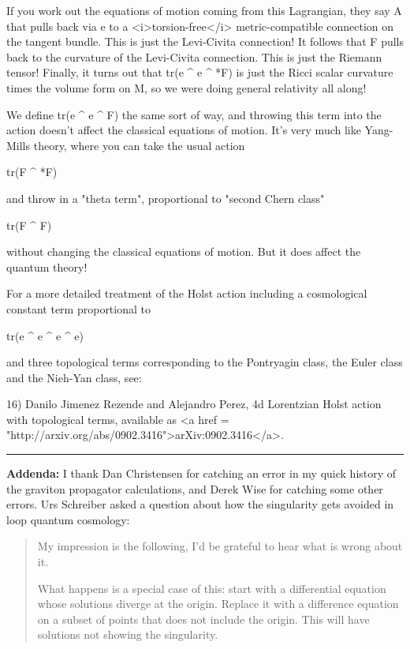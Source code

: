 If you work out the equations of motion coming from this Lagrangian,
they say A that pulls back via e to a <i>torsion-free</i>
metric-compatible connection on the tangent bundle.  This is just the
Levi-Civita connection!  It follows that F pulls back to the curvature
of the Levi-Civita connection.  This is just the Riemann tensor!
Finally, it turns out that tr(e ^ e ^ *F) is just the Ricci scalar
curvature times the volume form on M, so we were doing general
relativity all along!

We define tr(e ^ e ^ F) the same sort of way, and throwing this term
into the action doesn't affect the classical equations of motion.
It's very much like Yang-Mills theory, where you can take the usual
action

tr(F ^ *F)

and throw in a "theta term", proportional to
"second Chern class"

tr(F ^ F)

without changing the classical equations of motion.  But it does
affect the quantum theory!  

For a more detailed treatment of the Holst action including 
a cosmological constant term proportional to

tr(e ^ e ^ e ^ e)

and three topological terms corresponding to the Pontryagin 
class, the Euler class and the Nieh-Yan class, see:

16) Danilo Jimenez Rezende and Alejandro Perez, 
4d Lorentzian Holst action with topological terms, 
available as <a href = "http://arxiv.org/abs/0902.3416">arXiv:0902.3416</a>.

\par\noindent\rule{\textwidth}{0.4pt}

\textbf{Addenda:} I thank Dan Christensen for catching an error
in my quick history of the graviton propagator calculations, and
Derek Wise for catching some other errors.  
Urs Schreiber asked a question about how the singularity gets
avoided in loop quantum cosmology:

\begin{quote}

My impression is the following, I'd be grateful to hear what is wrong
about it.

What happens is a special case of this: start with a differential
equation whose solutions diverge at the origin. Replace it with a
difference equation on a subset of points that does not include the
origin. This will have solutions not showing the singularity.
\end{quote}

